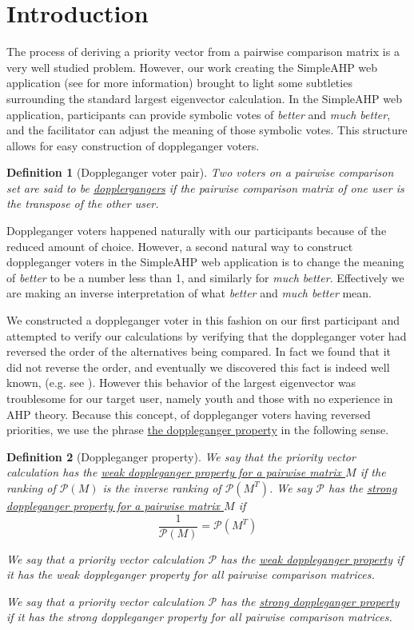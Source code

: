 \documentclass[11pt]{article}
\newtheorem{definition}{Definition}
\begin{document}
\section{Introduction}
The process of deriving a priority vector from a pairwise comparison matrix is a
very well studied problem.  However, our work creating the SimpleAHP web 
application (see \cite{adamsmont} for more information) brought to light some
subtleties surrounding the standard largest eigenvector calculation.
In the SimpleAHP web application, participants can provide symbolic votes
of \emph{better} and \emph{much better}, and the facilitator can adjust the
meaning of those symbolic votes.  This structure allows for easy construction
of doppleganger voters.
\begin{definition}[Doppleganger voter pair]
	Two voters on a pairwise comparison set are said to be \ul{dopplergangers} if
	the pairwise comparison matrix of one user is the transpose of the other user.
\end{definition}
Doppleganger voters happened naturally with our participants because of the
reduced amount of choice.  However, a second natural way to construct doppleganger
voters in the SimpleAHP web application is to change the meaning of \emph{better} 
to be a number less than 1, and similarly for \emph{much better}.  Effectively we
are making an inverse interpretation of what \emph{better} and \emph{much better} 
mean.

We constructed a doppleganger voter in this fashion on our first participant
and attempted to verify our calculations by verifying that the doppleganger voter
had reversed the order of the alternatives being compared.  In fact we found
that it did not reverse the order, and eventually we discovered this fact is
indeed well known, (e.g. see \cite{choo2004common}).  However this behavior
of the largest eigenvector was troublesome for our target user, namely youth
and those with no experience in AHP theory.  Because this concept, of
doppleganger voters having reversed priorities, we use the
phrase \ul{the doppleganger property} in the following sense.
\begin{definition}[Doppleganger property]
	We say that the priority vector calculation has the \ul{weak
	doppleganger property for a pairwise matrix $M$} if the ranking of
	$\mathcal{P}(M)$ is the inverse ranking of $\mathcal{P}(M^T)$.  
	We say $\mathcal{P}$ has the \ul{strong doppleganger property for a pairwise matrix $M$}
	if 
	$$\frac{1}{\mathcal{P}(M)} = \mathcal{P}(M^T)$$

	We say that a priority vector calculation $\mathcal{P}$
	has the \ul{weak doppleganger property} if it has the weak
	doppleganger property for all pairwise comparison matrices.
	
	We say that a priority vector calculation $\mathcal{P}$ has
	the \ul{strong doppleganger property} if it has the strong doppleganger
	property for all pairwise comparison matrices.
	
\end{definition}
\end{document}
